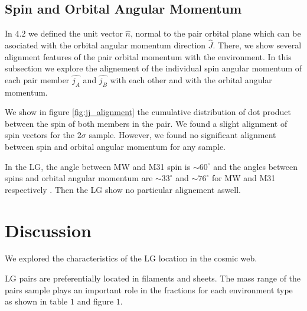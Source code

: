 \documentclass{emulateapj}
\begin{document}

\subsection{Spin and Orbital Angular Momentum}

In $4.2$ we defined the unit vector $\hat{n}$, normal to the pair 
orbital plane which can be asociated with the orbital angular 
momentum direction $\hat{J}$.
There, we show several alignment features of the pair orbital
momentum with the environment.
In this subsection we explore the alignement of the individual spin
angular momentum of each pair member $\hat{j_A}$ and $\hat{j_B}$ with
each other and with the orbital angular momentum.

We show in figure \ref{fig:jj_alignment} the cumulative distribution of
dot product between the spin of both members in the pair.
We found a slight alignment of spin vectors for the $2\sigma$ sample.
However, we found no significant alignment between spin and orbital angular 
momentum for any sample.

In the LG, the angle between MW and M31 spin is $\sim60^{\circ}$ and the
angles between spins and orbital angular momentum are $\sim33^{\circ}$
and $\sim76^{\circ}$ for MW and M31 respectively \citep{2012ApJ...753....9V}.
Then the LG show no particular alignement aswell. 

\section{Discussion}
\label{sec:discussion}

We explored the characteristics of the LG location in the cosmic web.

LG pairs are preferentially located in filaments and sheets. The mass range
of the pairs sample plays an important role in the fractions for each environment
type as shown in table $1$ and figure $1$.
\end{document}
